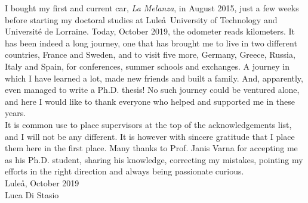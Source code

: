 I bought my first and current car, \emph{La Melanza}, in August 2015, just a few weeks before starting my doctoral studies at Lule\aa\ University of Technology and Universit\'e de Lorraine. Today, October 2019, the odometer reads kilometers. It has been indeed a long journey, one that has brought me to live in two different countries, France and Sweden, and to visit five more, Germany, Greece, Russia, Italy and Spain, for conferences, summer schools and exchanges. A journey in which I have learned a lot, made new friends and built a family. And, apparently, even managed to write a Ph.D. thesis! No such journey could be ventured alone, and here I would like to thank everyone who helped and supported me in these years.\\
It is common use to place supervisors at the top of the acknowledgements list, and I will not be any different. It is however with sincere gratitude that I place them here in the first place. Many thanks to Prof. Janis Varna for accepting me as his Ph.D. student, sharing his knowledge, correcting my mistakes, pointing my efforts in the right direction and always being passionate curious.\\[2.5cm]
Lule\aa, October 2019\\
Luca Di Stasio
